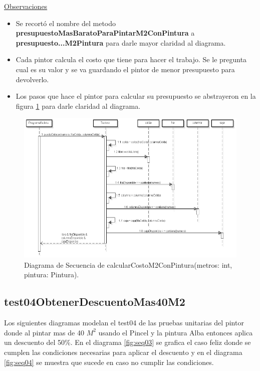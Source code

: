 \documentclass[titlepage,a4paper]{article}
\begin{document}
\newpage
\underline{Observaciones}
\begin{itemize}
  \item Se recortó el nombre del metodo \textbf{presupuestoMasBaratoParaPintarM2ConPintura}  a  \textbf{presupuesto...M2Pintura} para darle mayor claridad al diagrama.
  \item Cada pintor calcula el costo que tiene para hacer el trabajo. Se le pregunta cual es su valor y se va guardando el pintor de menor presupuesto para devolverlo.
  \item Los pasos que hace el pintor para calcular su presupuesto se abstrayeron en la figura \ref{fig:seq02} para darle claridad al diagrama.
\end{itemize}

\begin{figure}[H]
\centering
\includegraphics[width=\textwidth]{diagrama_secuencia02.png}
\caption{\label{fig:seq02} Diagrama de Secuencia de calcularCostoM2ConPintura(metros: int, pintura: Pintura).}
\end{figure}

\subsection{test04ObtenerDescuentoMas40M2}

Los siguientes diagramas modelan el test04 de las pruebas unitarias del pintor donde al pintar mas de
40 $M^2$ usando el Pincel y la pintura Alba entonces aplica un descuento del 50\%. En el diagrama \ref{fig:seq03} se 
grafica el caso feliz donde se cumplen las condiciones necesarias para aplicar el descuento y en el diagrama \ref{fig:seq04} 
se muestra que sucede en caso no cumplir las condiciones.
\end{document}
